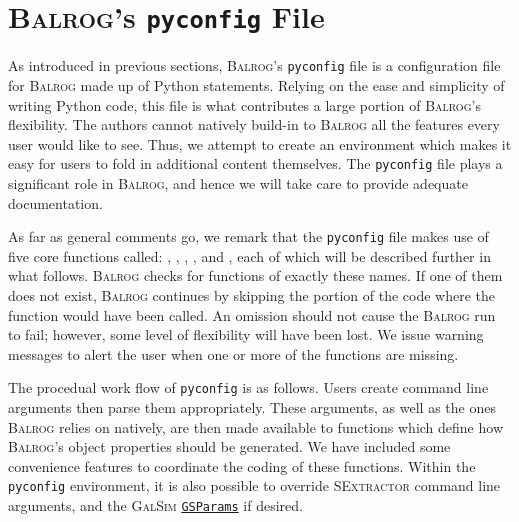 \documentclass[11pt]{book}
\newcommand{\codett}[1]{\lstinline{#1}}
\newcommand{\py}{Python}
\newcommand{\pyconfig}{\codett{pyconfig}}
\newcommand{\galsim}{\textsc{GalSim}}
\newcommand{\balrog}{\textsc{Balrog}}
\newcommand{\sex}{\textsc{SExtractor}}
\begin{document}
\begin{table}[h]
\begin{tabular}{l l l}
\end{tabular}
\end{table}

\chapter{\balrog{}'s \texttt{pyconfig} File}
\label{sec:pyconfig}

As introduced in previous sections, \balrog{}'s \pyconfig{} file is a configuration file for \balrog{} made up of \py{} statements.
Relying on the ease and simplicity of writing \py{} code, this file is what contributes a large portion of \balrog{}'s flexibility.
The authors cannot natively build-in to \balrog{} all the features every user would like to see.
Thus, we attempt to create an environment which makes it easy for users to fold in additional content themselves.
The \pyconfig{} file plays a significant role in \balrog{}, and hence we will take care to provide adequate documentation.

As far as general comments go, we remark that the \pyconfig{} file makes use of five core functions called:
\argsfunc, \parsefunc, \simfunc,  \gspfunc, and \sexfunc, each of which will be described further in what follows.
\balrog{} checks for functions of exactly these names.
If one of them does not exist, \balrog{} continues by skipping the portion of the code where the function would have been called.
An omission should not cause the \balrog{} run to fail; however, some level of flexibility will have been lost.
We issue warning messages to alert the user when one or more of the functions are missing.


The procedual work flow of \pyconfig{} is as follows.
Users create command line arguments then parse them appropriately.
These arguments, as well as the ones \balrog{} relies on natively, are then made available to 
functions which define how \balrog{}'s object properties should be generated.
We have included some convenience features to coordinate the coding of these functions. 
Within the \pyconfig{} environment, it is also possible to override \sex{} command line arguments, 
and the \galsim{} \href{http://galsim-developers.github.io/GalSim/structgalsim\_1\_1\_g\_s\_params.html}{\texttt{GSParams}} if desired.
\end{document}
